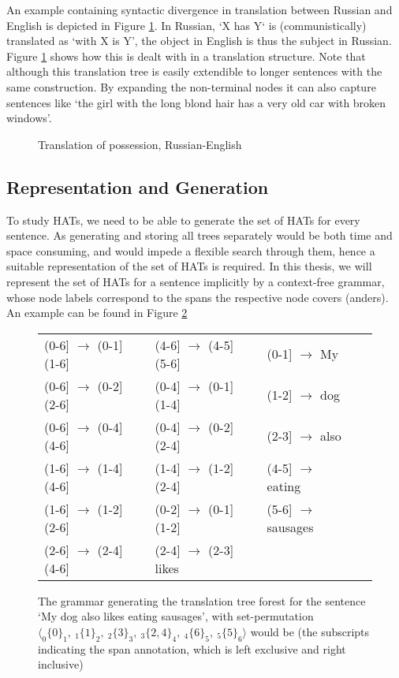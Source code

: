 \documentclass{report}
\begin{document}
An example containing syntactic divergence in translation between Russian and English is depicted in Figure \ref{fig:russian}. In Russian, `X has Y` is (communistically) translated as `with X is Y', the object in English is thus the subject in Russian. Figure \ref{fig:russian} shows how this is dealt with in a translation structure. Note that although this translation tree is easily extendible to longer sentences with the same construction. By expanding the non-terminal nodes it can also capture sentences like `the girl with the long blond hair has a very old car with broken windows'.

\begin{figure}[!ht]
\centering

\caption{Translation of possession, Russian-English}\label{fig:russian}
\end{figure}

\subsection{Representation and Generation}

To study HATs, we need to be able to generate the set of HATs for every sentence. As generating and storing all trees separately would be both time and space consuming, and would impede a flexible search through them, hence a suitable representation of the set of HATs is required. In this thesis, we will represent the set of HATs for a sentence implicitly by a context-free grammar, whose node labels correspond to the spans the respective node covers (anders). An example can be found in Figure \ref{fig:grammar}

\begin{figure}[!ht]\begin{framed}
\small{
\begin{tabular}{llllll}
(0-6] $\rightarrow$ (0-1]  (1-6] && (4-6] $\rightarrow$ (4-5]  (5-6] && (0-1] $\rightarrow$ My\\
(0-6] $\rightarrow$ (0-2]  (2-6] && (0-4] $\rightarrow$ (0-1]  (1-4] && (1-2] $\rightarrow$ dog\\
(0-6] $\rightarrow$ (0-4]  (4-6] && (0-4] $\rightarrow$ (0-2]  (2-4] && (2-3] $\rightarrow$ also\\
(1-6] $\rightarrow$ (1-4]  (4-6] && (1-4] $\rightarrow$ (1-2]  (2-4] && (4-5] $\rightarrow$ eating\\
(1-6] $\rightarrow$ (1-2]  (2-6] && (0-2] $\rightarrow$ (0-1]  (1-2] && (5-6] $\rightarrow$ sausages\\
(2-6] $\rightarrow$ (2-4]  (4-6] && (2-4] $\rightarrow$ (2-3] likes\\
\end{tabular}
\caption{The grammar generating the translation tree forest for the sentence
`My dog also likes eating sausages', with set-permutation $\langle _0\{0\}_1,~ _1\{1\}_2,~ _2\{3\}_3,~ _3\{2,4\}_4, ~_4\{6\}_5,~ _5\{5\}_6\rangle$ would be (the subscripts indicating the span annotation, which is left exclusive and right inclusive)}\label{fig:grammar}
}
\end{framed}
\end{figure}
\end{document}

